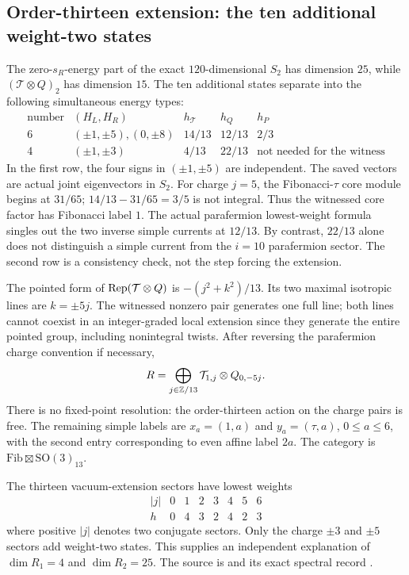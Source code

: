 \subsection{Order-thirteen extension: the ten additional weight-two states}
\label{expstructure:R-extension}

The zero-$s_R$-energy part of the exact $120$-dimensional $S_2$ has
dimension $25$, while $(\mathcal T\otimes Q)_2$ has dimension $15$.
The ten additional states separate into the following simultaneous
energy types:
\[
\begin{array}{c|c|c|c|c}
\text{number}&(H_L,H_R)&h_{\mathcal T}&h_Q&h_P\\\hline
6&(\pm1,\pm5),(0,\pm8)&14/13&12/13&2/3\\
4&(\pm1,\pm3)&4/13&22/13&\text{not needed for the witness}
\end{array}
\]
In the first row, the four signs in $(\pm1,\pm5)$ are independent.
The saved vectors are actual joint eigenvectors in $S_2$. For charge
$j=5$, the Fibonacci-$\tau$ core module begins at $31/65$;
$14/13-31/65=3/5$ is not integral. Thus the witnessed core factor
has Fibonacci label $1$. The actual parafermion lowest-weight
formula singles out the two inverse simple currents at $12/13$.
By contrast, $22/13$ alone does not distinguish a simple current
from the $i=10$ parafermion sector. The second row is a consistency
check, not the step forcing the extension.

The pointed form of $\operatorname{Rep}(\mathcal T\otimes Q)$ is
$-(j^2+k^2)/13$. Its two maximal isotropic lines are $k=\pm5j$.
The witnessed nonzero pair generates one full line; both lines
cannot coexist in an integer-graded local extension since they
generate the entire pointed group, including nonintegral twists.
After reversing the parafermion charge convention if necessary,
\[
 R=\bigoplus_{j\in\mathbb Z/13}\mathcal T_{1,j}\otimes Q_{0,-5j}.
\]
There is no fixed-point resolution: the order-thirteen action on
the charge pairs is free. The remaining simple labels are
$x_a=(1,a)$ and $y_a=(\tau,a)$, $0\leq a\leq6$, with the second
entry corresponding to even affine label $2a$. The category is
$\mathrm{Fib}\boxtimes\mathrm{SO}(3)_{13}$.

The thirteen vacuum-extension sectors have lowest weights
\[
\begin{array}{c|rrrrrrr}
 |j|&0&1&2&3&4&5&6\\\hline
 h&0&4&3&2&4&2&3
\end{array}
\]
where positive $|j|$ denotes two conjugate sectors. Only the charge
$\pm3$ and $\pm5$ sectors add weight-two states. This supplies an
independent explanation of $\dim R_1=4$ and $\dim R_2=25$.
The source is
 and its
exact spectral record
.

